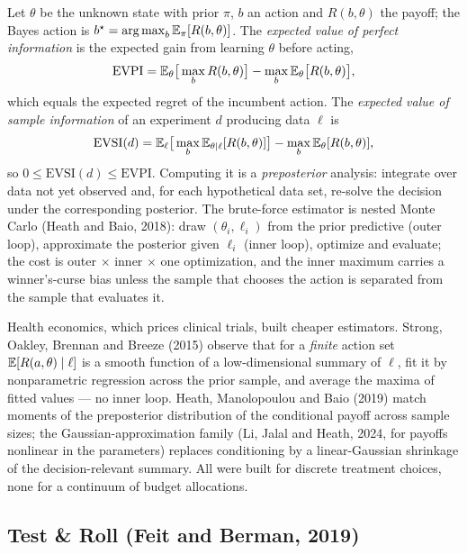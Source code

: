 Let $\theta$ be the unknown state with prior $\pi$, $b$ an action and $R(b,\theta)$ the payoff; the Bayes action is $b^\star = \operatorname*{arg\,max}_b \mathbb{E}_\pi[R(b,\theta)]$. The \emph{expected value of perfect information} is the expected gain from learning $\theta$ before acting,
\begin{equation}
\mathrm{EVPI} = \mathbb{E}_\theta\big[\max_b R(b,\theta)\big] - \max_b \mathbb{E}_\theta\big[R(b,\theta)\big],
\label{voi:eq:evpi-def}
\end{equation}
which equals the expected regret of the incumbent action. The \emph{expected value of sample information} of an experiment $d$ producing data $\ell$ is
\begin{equation}
\mathrm{EVSI}(d) = \mathbb{E}_\ell\big[\max_b \mathbb{E}_{\theta\mid\ell}[R(b,\theta)]\big] - \max_b \mathbb{E}_\theta[R(b,\theta)],
\label{voi:eq:evsi-def}
\end{equation}
so $0 \le \mathrm{EVSI}(d) \le \mathrm{EVPI}$. Computing it is a \emph{preposterior} analysis: integrate over data not yet observed and, for each hypothetical data set, re-solve the decision under the corresponding posterior. The brute-force estimator is nested Monte Carlo (Heath and Baio, 2018): draw $(\theta_i,\ell_i)$ from the prior predictive (outer loop), approximate the posterior given $\ell_i$ (inner loop), optimize and evaluate; the cost is outer $\times$ inner $\times$ one optimization, and the inner maximum carries a winner's-curse bias unless the sample that chooses the action is separated from the sample that evaluates it.

Health economics, which prices clinical trials, built cheaper estimators. Strong, Oakley, Brennan and Breeze (2015) observe that for a \emph{finite} action set $\mathbb{E}[R(a,\theta)\mid\ell]$ is a smooth function of a low-dimensional summary of $\ell$, fit it by nonparametric regression across the prior sample, and average the maxima of fitted values --- no inner loop. Heath, Manolopoulou and Baio (2019) match moments of the preposterior distribution of the conditional payoff across sample sizes; the Gaussian-approximation family (Li, Jalal and Heath, 2024, for payoffs nonlinear in the parameters) replaces conditioning by a linear-Gaussian shrinkage of the decision-relevant summary. All were built for discrete treatment choices, none for a continuum of budget allocations.

\subsection{Test \& Roll (Feit and Berman, 2019)}

